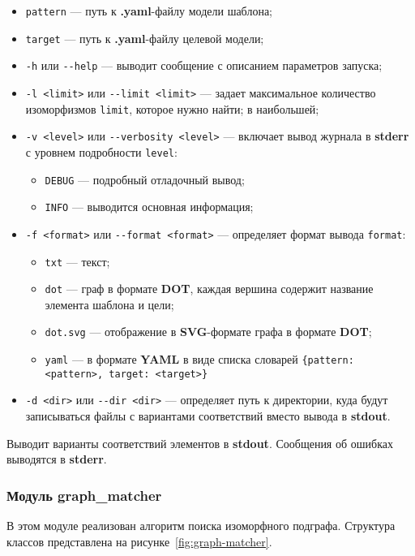 \begin{itemize}
\item \verb;pattern; --- путь к \textbf{.yaml}-файлу модели шаблона;
\item \verb;target; --- путь к \textbf{.yaml}-файлу целевой модели;
\item \verb;-h; или \verb;--help; --- выводит сообщение с описанием параметров
запуска;
\item \verb;-l <limit>; или \verb;--limit <limit>; --- задает максимальное
количество изоморфизмов \verb;limit;, которое нужно найти;
в наибольшей;
\item \verb;-v <level>; или \verb;--verbosity <level>; --- включает вывод
журнала в \textbf{stderr} с уровнем подробности \verb;level;:
\begin{itemize}
\item \verb;DEBUG; --- подробный отладочный вывод;
\item \verb;INFO; --- выводится основная информация;
\end{itemize}
\item \verb;-f <format>; или \verb;--format <format>; --- определяет формат
вывода \verb;format;:
\begin{itemize}
\item \verb;txt; --- текст;
\item \verb;dot; --- граф в формате \textbf{DOT}, каждая вершина содержит
название элемента шаблона и цели;
\item \verb;dot.svg; --- отображение в \textbf{SVG}-формате графа в формате
\textbf{DOT};
\item \verb;yaml; --- в формате \textbf{YAML} в виде списка словарей \verb;{pattern: <pattern>, target: <target>};
\end{itemize}
\item \verb;-d <dir>; или \verb;--dir <dir>; --- определяет путь к директории,
куда будут записываться файлы с вариантами соответствий вместо вывода в
\textbf{stdout}.
\end{itemize}

Выводит варианты соответствий элементов в \textbf{stdout}.
Сообщения об ошибках выводятся в \textbf{stderr}.

\subsubsection{Модуль graph\_matcher}

В этом модуле реализован алгоритм поиска изоморфного подграфа.
Структура классов представлена на рисунке~\ref{fig:graph-matcher}.

